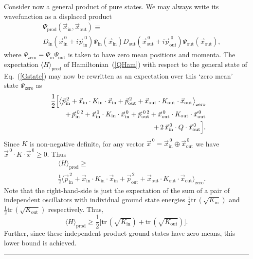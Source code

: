 \documentclass[aps,showpacs,prl,12pt]{revtex4}
\begin{document}
Consider now a general product of pure states. We may always write its
wavefunction as a displaced product
\begin{eqnarray}
\!\!\!\!\!&&\!\Psi_{\text{prod}}(\vec x_{\text{in}}, \vec x_{\text{out}})
\label{Gstate}\equiv \\
\!\!\!\!\!&&\!
D_{\text{in}}(\vec x_{\text{in}}^{\,0}+i\vec p_{\text{in}}^{\;0})
\Psi_{\text{in}}(\vec x_{\text{in}})
D_{\text{out}}(\vec x_{\text{out}}^{\,0}+i\vec p_{\text{out}}^{\;0})
\Psi_{\text{out}}(\vec x_{\text{out}}),\nonumber
\end{eqnarray}
where $\Psi_{\text{zero}}\equiv \Psi_{\text{in}} \Psi_{\text{out}}$
is taken to have zero mean positions and momenta. The expectation 
$\langle H\rangle_{\text{prod}}$ of Hamiltonian~(\ref{QHam}) with
respect to the general state of Eq.~(\ref{Gstate}) may now be rewritten
as an expectation over this `zero mean' state $\Psi_{\text{zero}}$ as
\begin{eqnarray}
\!\!\!&&\frac{1}{2}\Bigl[\bigl\langle\vec p_{\text{in}}^{\,2}
+\vec x_{\text{in}}\cdot K_{\text{in}} \cdot \vec x_{\text{in}}
+ \vec p_{\text{out}}^{\,2}
+\vec x_{\text{out}}\cdot K_{\text{out}} \cdot \vec x_{\text{out}}
\bigr\rangle_{\text{zero}} \nonumber \\
\!\!\!&& +\,\vec p_{\text{in}}^{\;0\,2}
+\vec x_{\text{in}}^{\,0}\cdot K_{\text{in}} \cdot \vec x_{\text{in}}^{\,0}
+ \vec p_{\text{out}}^{\;0\,2}
+\vec x_{\text{out}}^{\,0}\cdot K_{\text{out}} \cdot \vec x_{\text{out}}^{\,0}
\nonumber \\
\!\!\!&&+\,2\,\vec x_{\text{in}}^{\,0}\cdot Q\cdot \vec x_{\text{out}}^{\,0}
\Bigr].
\end{eqnarray}
Since $K$ is non-negative definite, for any vector
$\vec x^{\,0}=\vec x_{\text{in}}^{\,0}\oplus \vec x_{\text{out}}^{\,0}$
we have $\vec x^{\,0}\cdot K \cdot \vec x^{\,0}\ge 0$. Thus
\begin{eqnarray}
\!\!\!\!\!&&\langle H\rangle_{\text{prod}}\ge\\
\!\!\!\!\!&& \frac{1}{2}
\bigl\langle\vec p_{\text{in}}^{\,2}
+\vec x_{\text{in}}\cdot K_{\text{in}} \cdot \vec x_{\text{in}}
+ \vec p_{\text{out}}^{\,2}
+\vec x_{\text{out}}\cdot K_{\text{out}} \cdot \vec x_{\text{out}}
\bigr\rangle_{\text{zero}}.\nonumber
\end{eqnarray}
Note that the right-hand-side is just the expectation of the sum of a pair
of independent oscillators with individual ground state energies 
$\frac{1}{2} \text{tr}\,( \sqrt{K_{\text{in}}})$ and 
$\frac{1}{2} \text{tr}\,( \sqrt{K_{\text{out}}})$ respectively. Thus,
\begin{equation}
\langle H\rangle_{\text{prod}}\ge 
\frac{1}{2}\bigl[ \text{tr}\,( \sqrt{K_{\text{in}}})
+\text{tr}\,( \sqrt{K_{\text{out}}})\bigr].
\end{equation}
Further, since these independent product ground states have zero means,
this lower bound is achieved.
${~}$\hfill \rule{2mm}{2mm}\\
\end{document}
